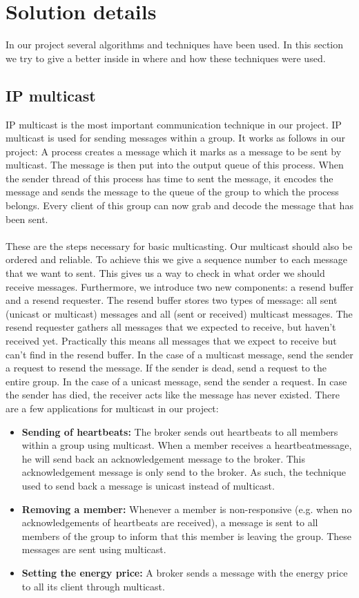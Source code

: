 \documentclass[10pt]{article} %
\begin{document}
\section{Solution details}
In our project several algorithms and techniques have been used. In this section we try to give a better inside in where and how these techniques were used.
\subsection{IP multicast}
IP multicast is the most important communication technique in our project. IP multicast is used for sending messages within a group. It works as follows in our project: A process creates a message which it marks as a message to be sent by multicast. The message is then put into the output queue of this process. When the sender thread of this process has time to sent the message, it encodes the message and sends the message to the queue of the group to which the process belongs. Every client of this group can now grab and decode the message that has been sent.\\
\\
These are the steps necessary for basic multicasting. Our multicast should also be ordered and reliable. To achieve this we give a sequence number to each message that we want to sent. This gives us a way to check in what order we should receive messages. Furthermore, we introduce two new components: a resend buffer and a resend requester. The resend buffer stores two types of message: all sent (unicast or multicast) messages and all (sent or received) multicast messages. The resend requester gathers all messages that we expected to receive, but haven't received yet. Practically this means all messages that we expect to receive but can't find in the resend buffer. In the case of a multicast message, send the sender a request to resend the message. If the sender is dead, send a request to the entire group. In the case of a unicast message, send the sender a request. In case the sender has died, the receiver acts like the message has never existed. There are a few applications for multicast in our project:
\begin{itemize}
 \item \textbf{Sending of heartbeats:} The broker sends out heartbeats to all members within a group using multicast. When a member receives a heartbeatmessage, he will send back an acknowledgement message to the broker. This acknowledgement message is only send to the broker. As such, the technique used  to send back a message is unicast instead of multicast.\\
 \item \textbf{Removing a member:} Whenever a member is non-responsive (e.g. when no acknowledgements of heartbeats are received), a message is sent to all members of the group to inform that this member is leaving the group. These messages are sent using multicast.\\
 \item \textbf{Setting the energy price:} A broker sends a message with the energy price to all its client through multicast.\\
\end{itemize}
\end{document}
